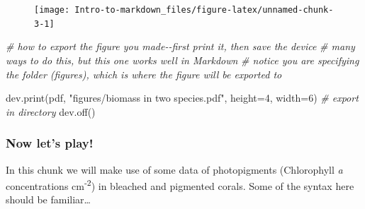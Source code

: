 \documentclass[
]{article}
\newenvironment{Shaded}{\begin{snugshade}}{\end{snugshade}}
\newcommand{\AttributeTok}[1]{\textcolor[rgb]{0.77,0.63,0.00}{#1}}
\newcommand{\CommentTok}[1]{\textcolor[rgb]{0.56,0.35,0.01}{\textit{#1}}}
\newcommand{\DecValTok}[1]{\textcolor[rgb]{0.00,0.00,0.81}{#1}}
\newcommand{\FunctionTok}[1]{\textcolor[rgb]{0.00,0.00,0.00}{#1}}
\newcommand{\NormalTok}[1]{#1}
\newcommand{\StringTok}[1]{\textcolor[rgb]{0.31,0.60,0.02}{#1}}
\begin{document}
\begin{figure}

{\centering \texttt{[image: Intro-to-markdown\_files/figure-latex/unnamed-chunk-3-1]} 

}

\end{figure}

\begin{Shaded}
\begin{Highlighting}[]
\CommentTok{\# how to export the figure you made{-}{-}first print it, then save the device}
\CommentTok{\# many ways to do this, but this one works well in Markdown}
\CommentTok{\# notice you are specifying the folder (\textquotesingle{}figures\textquotesingle{}), which is where the figure will be exported to}

\FunctionTok{dev.print}\NormalTok{(pdf, }\StringTok{"figures/biomass in two species.pdf"}\NormalTok{, }\AttributeTok{height=}\DecValTok{4}\NormalTok{, }\AttributeTok{width=}\DecValTok{6}\NormalTok{) }\CommentTok{\# export in directory}
\FunctionTok{dev.off}\NormalTok{()}
\end{Highlighting}
\end{Shaded}

\hypertarget{now-lets-play}{%
\subsubsection{Now let's play!}\label{now-lets-play}}

In this chunk we will make use of some data of photopigments
(Chlorophyll \emph{a} concentrations cm\textsuperscript{-2}) in bleached
and pigmented corals. Some of the syntax here should be familiar\ldots{}
\end{document}
